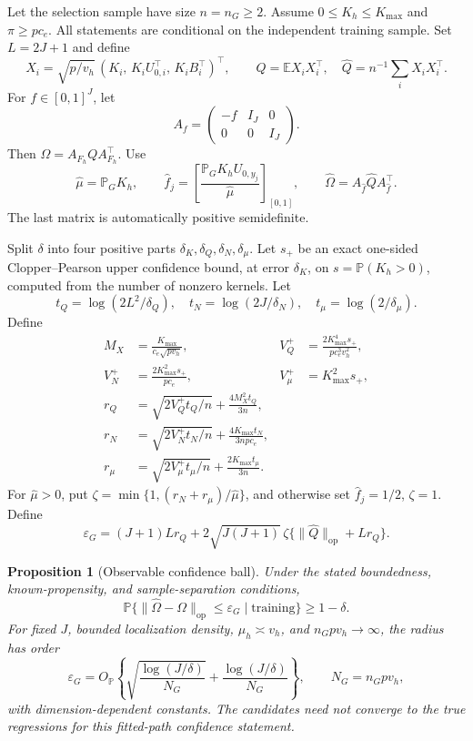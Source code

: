 \documentclass[11pt]{article}
\newtheorem{proposition}[theorem]{Proposition}
\theoremstyle{remark}\newtheorem{remark}[theorem]{Remark}
\newcommand{\E}{\mathbb E}
\newcommand{\Pp}{\mathbb P}
\newcommand{\op}{\mathrm{op}}
\begin{document}
Let the selection sample have size $n=n_G\geq2$. Assume $0\leq K_h\leq K_{\max}$ and $\pi\geq pc_e$. All statements are conditional on the independent training sample. Set $L=2J+1$ and define
\[
 X_i=\sqrt{p/v_h}\,(K_i,\,K_iU_{0,i}^\top,\,K_iB_i^\top)^\top,\qquad
 Q=\E X_iX_i^\top,\quad \widehat Q=n^{-1}\sum_iX_iX_i^\top.
\]
For $f\in[0,1]^J$, let
\[
 A_f=\begin{pmatrix}-f&I_J&0\\0&0&I_J\end{pmatrix}.
\]
Then $\Omega=A_{F_h}QA_{F_h}^\top$. Use
\[
 \widehat\mu=\mathbb P_GK_h,\qquad
 \widehat f_j=\left[\frac{\mathbb P_GK_hU_{0,y_j}}{\widehat\mu}\right]_{[0,1]},\qquad
 \widehat\Omega=A_{\widehat f}\widehat Q A_{\widehat f}^\top.
\]
The last matrix is automatically positive semidefinite.

Split $\delta$ into four positive parts $\delta_K,\delta_Q,\delta_N,\delta_\mu$.
Let $s_+$ be an exact one-sided Clopper--Pearson upper confidence bound, at error $\delta_K$, on $s=\Pp(K_h>0)$, computed from the number of nonzero kernels. Let
\[
 t_Q=\log(2L^2/\delta_Q),\quad t_N=\log(2J/\delta_N),\quad t_\mu=\log(2/\delta_\mu).
\]
Define
\begin{align*}
 M_X&=\frac{K_{\max}}{c_e\sqrt{pv_h}},&
 V_Q^+&=\frac{2K_{\max}^4s_+}{p c_e^3v_h^2},\\
 V_N^+&=\frac{2K_{\max}^2s_+}{pc_e},&
 V_\mu^+&=K_{\max}^2s_+,\\
 r_Q&=\sqrt{2V_Q^+t_Q/n}+\frac{4M_X^2t_Q}{3n},\\
 r_N&=\sqrt{2V_N^+t_N/n}+\frac{4K_{\max}t_N}{3npc_e},\\
 r_\mu&=\sqrt{2V_\mu^+t_\mu/n}+\frac{2K_{\max}t_\mu}{3n}.
\end{align*}
For $\widehat\mu>0$, put $\zeta=\min\{1,(r_N+r_\mu)/\widehat\mu\}$, and otherwise set $\widehat f_j=1/2$, $\zeta=1$. Define
\begin{equation}
 \varepsilon_G=(J+1)Lr_Q+
 2\sqrt{J(J+1)}\,\zeta\{\|\widehat Q\|_\op+Lr_Q\}.
 \label{eq:radius}
\end{equation}
\begin{proposition}[Observable confidence ball]\label{prop:covball}
Under the stated boundedness, known-propensity, and sample-separation conditions,
\[
 \Pp\{\|\widehat\Omega-\Omega\|_\op\leq\varepsilon_G\mid\text{training}\}\geq1-\delta.
\]
For fixed $J$, bounded localization density, $\mu_h\asymp v_h$, and $n_Gpv_h\to\infty$, the radius has order
\begin{equation}
 \varepsilon_G=O_\Pp\left\{\sqrt{\frac{\log(J/\delta)}{N_G}}+
 \frac{\log(J/\delta)}{N_G}\right\},\qquad N_G=n_Gpv_h,
 \label{eq:rate}
\end{equation}
with dimension-dependent constants. The candidates need not converge to the true regressions for this fitted-path confidence statement.
\end{proposition}
\end{document}
